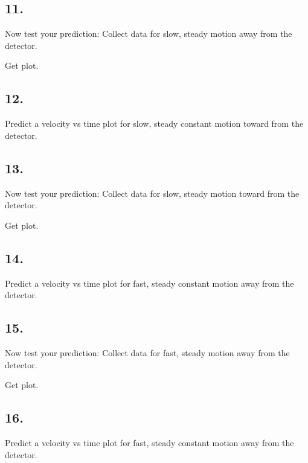     \subsection*{11.}
    Now test your prediction: Collect data for slow, steady motion away from the detector.

    \begin{mdframed}
        Get plot.
    \end{mdframed}

    \subsection*{12.}
    Predict a velocity vs time plot for slow, steady constant motion toward from the detector. 

    \begin{mdframed}
        
    \end{mdframed}

    \subsection*{13.}
    Now test your prediction: Collect data for slow, steady motion toward from the detector.

    \begin{mdframed}
        Get plot.
    \end{mdframed}


    \subsection*{14.}
    Predict a velocity vs time plot for fast, steady constant motion away from the detector. 

    \begin{mdframed}
        
    \end{mdframed}

    \subsection*{15.}
    Now test your prediction: Collect data for fast, steady motion away from the detector.

    \begin{mdframed}
        Get plot.
    \end{mdframed}

    \subsection*{16.}
    Predict a velocity vs time plot for fast, steady constant motion away from the detector. 

